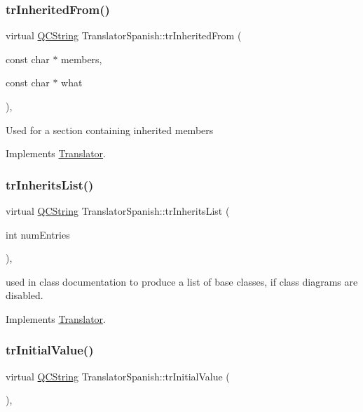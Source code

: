 \subsubsection{\texorpdfstring{trInheritedFrom()}{trInheritedFrom()}}
{\footnotesize\ttfamily virtual \mbox{\hyperlink{class_q_c_string}{Q\+C\+String}} Translator\+Spanish\+::tr\+Inherited\+From (\begin{DoxyParamCaption}\item[{const char $\ast$}]{members,  }\item[{const char $\ast$}]{what }\end{DoxyParamCaption})\hspace{0.3cm}{\ttfamily [inline]}, {\ttfamily [virtual]}}

Used for a section containing inherited members 

Implements \mbox{\hyperlink{class_translator}{Translator}}.

\mbox{\label{class_translator_spanish_a8029d303a4f87681a5e19b9635a3baee}} 
\subsubsection{\texorpdfstring{trInheritsList()}{trInheritsList()}}
{\footnotesize\ttfamily virtual \mbox{\hyperlink{class_q_c_string}{Q\+C\+String}} Translator\+Spanish\+::tr\+Inherits\+List (\begin{DoxyParamCaption}\item[{int}]{num\+Entries }\end{DoxyParamCaption})\hspace{0.3cm}{\ttfamily [inline]}, {\ttfamily [virtual]}}

used in class documentation to produce a list of base classes, if class diagrams are disabled. 

Implements \mbox{\hyperlink{class_translator}{Translator}}.

\mbox{\label{class_translator_spanish_a7dd476066a389faafed57a8345d93d4f}} 
\subsubsection{\texorpdfstring{trInitialValue()}{trInitialValue()}}
{\footnotesize\ttfamily virtual \mbox{\hyperlink{class_q_c_string}{Q\+C\+String}} Translator\+Spanish\+::tr\+Initial\+Value (\begin{DoxyParamCaption}{ }\end{DoxyParamCaption})\hspace{0.3cm}{\ttfamily [inline]}, {\ttfamily [virtual]}}

